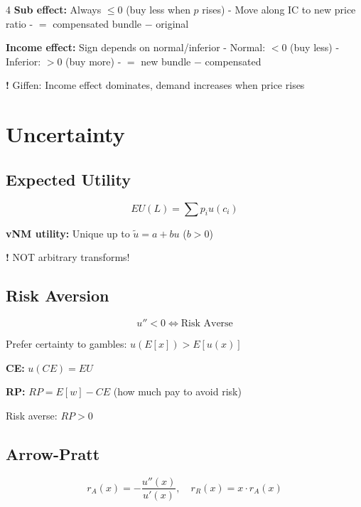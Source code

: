 \documentclass[8pt,landscape]{article}
\newcommand{\tip}[1]{\textcolor{red!70!black}{\textbf{!} #1}}
\begin{document}
\begin{multicols}{4}
\textbf{Sub effect:} Always $\leq 0$ (buy less when $p$ rises)
- Move along IC to new price ratio
- $=$ compensated bundle $-$ original

\textbf{Income effect:} Sign depends on normal/inferior
- Normal: $< 0$ (buy less)
- Inferior: $> 0$ (buy more)
- $=$ new bundle $-$ compensated

\tip{Giffen:} Income effect dominates, demand increases when price rises

\section{Uncertainty}

\subsection{Expected Utility}
$$EU(L) = \sum p_i u(c_i)$$

\textbf{vNM utility:} Unique up to $\tilde{u} = a + bu$ ($b > 0$)

\tip{NOT arbitrary transforms!}

\subsection{Risk Aversion}
$$u'' < 0 \Leftrightarrow \text{Risk Averse}$$

Prefer certainty to gambles: $u(E[x]) > E[u(x)]$

\begin{center}
\end{center}

\textbf{CE:} $u(CE) = EU$

\textbf{RP:} $RP = E[w] - CE$ (how much pay to avoid risk)

Risk averse: $RP > 0$

\subsection{Arrow-Pratt}
$$r_A(x) = -\frac{u''(x)}{u'(x)}, \quad r_R(x) = x \cdot r_A(x)$$


\end{multicols}
\end{document}
